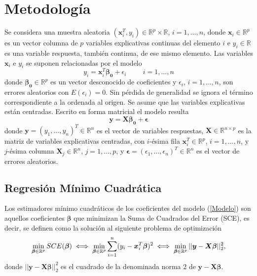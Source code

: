\documentclass[a4paper,12pt]{article}
\begin{document}
\newpage

\section{Metodología}

Se considera una muestra aleatoria $(\boldsymbol{x}_i^T, y_i) \in \mathbb{R}^p \times \mathbb{R}$, $i=1,...,n$, donde $\boldsymbol{x}_i \in \mathbb{R}^p$ es un vector columna de $p$ variables explicativas continuas del elemento $i$ e $y_i \in \mathbb{R}$ es una variable respuesta, también continua, de ese mismo elemento. Las variables $\boldsymbol{x}_i$ e $y_i$ se suponen relacionadas por el modelo
\begin{equation}
\label{Modelo}
y_i = \boldsymbol{x}^T_i \boldsymbol{\beta_0}+\epsilon_i \hspace{1cm} i=1,...,n
\end{equation}
donde $\boldsymbol{\beta_0} \in \mathbb{R}^p$ es un vector desconocido de coeficientes y $\epsilon_i$, $i=1,...,n$, son errores aleatorios con $E(\epsilon_i)=0$. Sin pérdida de generalidad se ignora el término correspondiente a la ordenada al origen. Se asume que las variables explicativas están centradas. Escrito en forma matricial el modelo resulta
\begin{equation}
\boldsymbol{y}=\boldsymbol{X}\boldsymbol{\beta_0}+\boldsymbol{\epsilon}
\end{equation} 
donde $\boldsymbol{y}=(y_1,...,y_n)^T \in \mathbb{R}^n$ es el vector de variables respuestas, $\boldsymbol{X} \in \mathbb{R}^{n \times p}$ es la matriz de variables explicativas centradas, con $i$-ésima fila $\boldsymbol{x}_i^T \in \mathbb{R}^p$, $i=1,...,n$, y $j$-ésima columna $\boldsymbol{X}_j \in \mathbb{R}^n$, $j=1,...,p$, y $\boldsymbol{\epsilon}=(\epsilon_1,...,\epsilon_n)^T \in \mathbb{R}^n$ es el vector de errores aleatorios.

\subsection*{Regresión Mínimo Cuadrática}
Los estimadores mínimo cuadráticos de los coeficientes del modelo (\ref{Modelo}) son aquellos coeficientes $\boldsymbol{\beta}$ que minimizan la Suma de Cuadrados del Error (SCE), es decir, se definen como la solución al siguiente problema de optimización
\begin{equation}
\label{LSProblem}
\operatornamewithlimits{min}\limits_{\boldsymbol{\beta} \in \mathbb{R}^p}SCE(\boldsymbol{\beta}) \iff \operatornamewithlimits{min}\limits_{\boldsymbol{\beta} \in \mathbb{R}^p} \sum_{i=1}^n (y_i-\boldsymbol{x}_i^T\boldsymbol{\beta})^2 \iff \operatornamewithlimits{min}\limits_{\boldsymbol{\beta} \in \mathbb{R}^p} ||\boldsymbol{y}-\boldsymbol{X\beta} ||_2^2,
\end{equation}
donde $||\boldsymbol{y}-\boldsymbol{X\beta} ||_2^2$ es el cuadrado de la denominada norma 2 de $\boldsymbol{y}-\boldsymbol{X\beta}$.
\end{document}
